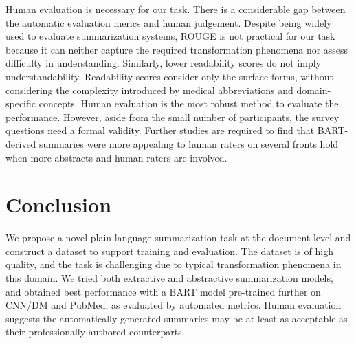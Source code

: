 \documentclass[letterpaper, table]{article} %
\begin{document}
Human evaluation is necessary for our task.
There is a considerable gap between the automatic evaluation merics
and human judgement.
Despite being widely used to evaluate summarization systems, ROUGE is not practical for our task because it can neither capture the required transformation phenomena nor assess difficulty in understanding.
Similarly, lower readability scores do not imply understandability.
Readability scores consider only the surface forms,
without considering the complexity introduced by medical abbreviations and domain-specific concepts.
Human evaluation is the most robust method to evaluate the performance.
However, aside from the small number of participants,
the survey questions need a formal validity.
Further studies are required to find that BART-derived summaries were more appealing to human raters on several fronts hold when more abstracts and human raters are involved.






\section{Conclusion}
We propose a novel plain language summarization task at the document level and construct a dataset to support training and evaluation. The dataset is of high quality, and the task is challenging due to typical transformation phenomena in this domain. We tried both extractive and abstractive summarization models, and obtained best performance with a BART model pre-trained further on CNN/DM and PubMed, as evaluated by automated metrics. Human evaluation suggests the automatically generated summaries may be at least as acceptable as their professionally authored counterparts.
\end{document}
